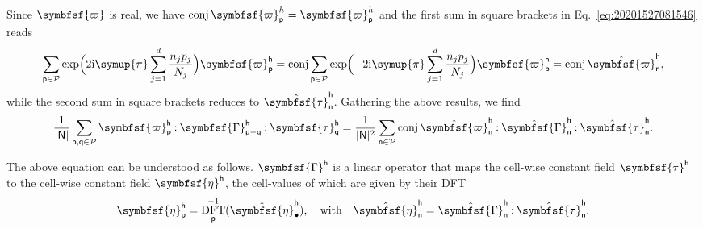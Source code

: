 \documentclass[draft, appendixprefix=true, chapterprefix=true, fontsize=12pt, numbers=noendperiod]{scrbook}
\newcommand{\cellindices}{\mathcal P}
\DeclareMathOperator{\conj}{conj}
\newcommand{\dbldot}{\mathbin{\mathord{:}}}
\DeclareMathOperator{\dft}{DFT}
\newcommand{\I}{\mathrm{i}}
\newcommand{\tens}[1]{\symbfsf{#1}}
\newcommand{\PI}{\symup{\pi}}
\newcommand{\tuple}[1]{\mathsf{#1}}
\begin{document}
Since \(\tens\varpi\) is real, we have
\(\conj\tens\varpi_{\tuple p}^h=\tens\varpi_{\tuple p}^h\) and the first sum in
square brackets in Eq.~\eqref{eq:20201527081546} reads
\begin{equation}
  \sum_{\tuple{p}\in\cellindices}\exp\Bigl(2\I\PI\sum_{j=1}^d\frac{n_jp_j}{N_j}\Bigr)
  \tens\varpi_{\tuple p}^{\tuple h}=\conj\sum_{\tuple{p}\in\cellindices}\exp
  \Bigl(-2\I\PI\sum_{j=1}^d\frac{n_jp_j}{N_j}\Bigr)\tens\varpi_{\tuple p}^{\tuple h}
  =\conj\hat{\tens\varpi}_{\tuple n}^{\tuple h},
\end{equation}
while the second sum in square brackets reduces to
\(\hat{\tens\tau}_{\tuple n}^{\tuple h}\). Gathering the above results, we find
\begin{equation}
  \frac{1}{\lvert\tuple N\rvert}\sum_{\tuple p, \tuple q\in\cellindices}
  \tens\varpi_{\tuple p}^{\tuple h}\dbldot\tens\Gamma_{\tuple p-\tuple q}^{\tuple h}
  \dbldot\tens\tau_{\tuple q}^{\tuple h}=\frac1{\lvert\tuple N\rvert^2}
  \sum_{\tuple n\in\cellindices}\conj\hat{\tens\varpi}_{\tuple n}^{\tuple h}
  \dbldot\hat{\tens\Gamma}_{\tuple n}^{\tuple h}\dbldot
  \hat{\tens\tau}_{\tuple n}^{\tuple h}.
\end{equation}

The above equation can be understood as follows. \(\tens\Gamma^{\tuple h}\) is
a linear operator that maps the cell-wise constant field
\(\tens\tau^{\tuple h}\) to the cell-wise constant field
\(\tens\eta^{\tuple h}\), the cell-values of which are given by their DFT
\begin{equation}
  \tens{\eta}_{\tuple p}^{\tuple h}=
  \dft^{-1}_{\tuple p}(\hat{\tens\eta}_{\bullet}^{\tuple h}),\quad\text{with}
  \quad\hat{\tens\eta}_{\tuple n}^{\tuple h}
  =\hat{\tens\Gamma}_{\tuple n}^{\tuple h}\dbldot
  \hat{\tens\tau}_{\tuple n}^{\tuple h}.
\end{equation}
\end{document}
